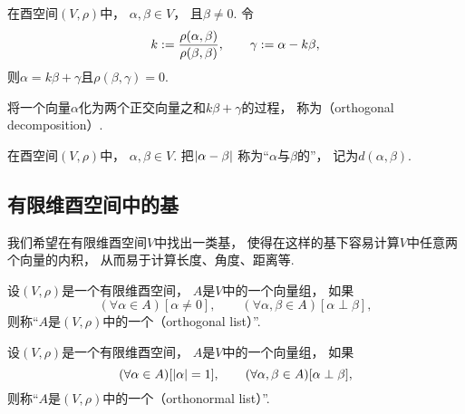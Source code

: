 \begin{proposition}\label{theorem:酉空间.向量的正交分解}
在酉空间\((V,\rho)\)中，
\(\alpha,\beta \in V\)，
且\(\beta \neq 0\).
令\begin{equation*}
	k := \frac{\rho(\alpha,\beta)}{\rho(\beta,\beta)},
	\qquad
	\gamma := \alpha - k \beta,
\end{equation*}
则\(\alpha = k\beta + \gamma\)且\(\rho(\beta,\gamma) = 0\).
\end{proposition}
\begin{remark}
将一个向量\(\alpha\)化为两个正交向量之和\(k\beta + \gamma\)的过程，
称为（orthogonal decomposition）.
\end{remark}

\begin{definition}
在酉空间\((V,\rho)\)中，
\(\alpha,\beta \in V\).
把\(\abs{\alpha-\beta}\)
称为“\(\alpha\)与\(\beta\)的”，
记为\(d(\alpha,\beta)\).
\end{definition}

\subsection{有限维酉空间中的基}
我们希望在有限维酉空间\(V\)中找出一类基，
使得在这样的基下容易计算\(V\)中任意两个向量的内积，
从而易于计算长度、角度、距离等.

\begin{definition}
设\((V,\rho)\)是一个有限维酉空间，
\(A\)是\(V\)中的一个向量组，
如果\begin{equation*}
	(\forall \alpha \in A)
	[\alpha\neq0],
	\qquad
	(\forall \alpha,\beta \in A)
	[\alpha \perp \beta],
\end{equation*}
则称“\(A\)是\((V,\rho)\)中的一个（orthogonal list）”.
\end{definition}

\begin{definition}
设\((V,\rho)\)是一个有限维酉空间，
\(A\)是\(V\)中的一个向量组，
如果\begin{equation*}
	(\forall \alpha \in A)
	[\abs{\alpha} = 1],
	\qquad
	(\forall \alpha,\beta \in A)
	[\alpha \perp \beta],
\end{equation*}
则称“\(A\)是\((V,\rho)\)中的一个（orthonormal list）”.
\end{definition}

